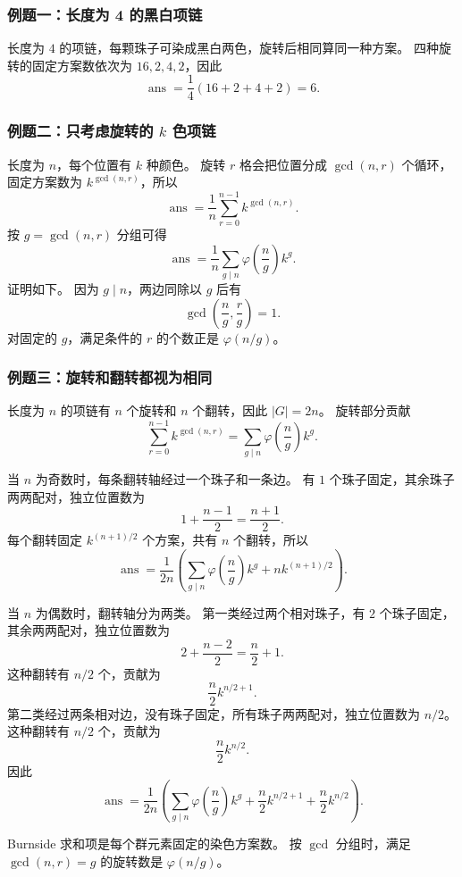 \subsubsection{例题一：长度为 4 的黑白项链}

长度为 $4$ 的项链，每颗珠子可染成黑白两色，旋转后相同算同一种方案。
四种旋转的固定方案数依次为 $16,2,4,2$，因此
\[
  \operatorname{ans}=\frac14(16+2+4+2)=6.
\]

\subsubsection{例题二：只考虑旋转的 $k$ 色项链}

长度为 $n$，每个位置有 $k$ 种颜色。
旋转 $r$ 格会把位置分成 $\gcd(n,r)$ 个循环，固定方案数为 $k^{\gcd(n,r)}$，所以
\[
  \operatorname{ans}
  =\frac1n\sum_{r=0}^{n-1}k^{\gcd(n,r)}.
\]
按 $g=\gcd(n,r)$ 分组可得
\[
  \operatorname{ans}
  =\frac1n\sum_{g\mid n}\varphi\!\left(\frac ng\right)k^g.
\]
证明如下。
因为 $g\mid n$，两边同除以 $g$ 后有
\[
  \gcd\!\left(\frac ng,\frac rg\right)=1.
\]
对固定的 $g$，满足条件的 $r$ 的个数正是 $\varphi(n/g)$。

\subsubsection{例题三：旋转和翻转都视为相同}

长度为 $n$ 的项链有 $n$ 个旋转和 $n$ 个翻转，因此 $|G|=2n$。
旋转部分贡献
\[
  \sum_{r=0}^{n-1}k^{\gcd(n,r)}
  =\sum_{g\mid n}\varphi\!\left(\frac ng\right)k^g.
\]

当 $n$ 为奇数时，每条翻转轴经过一个珠子和一条边。
有 $1$ 个珠子固定，其余珠子两两配对，独立位置数为
\[
  1+\frac{n-1}{2}=\frac{n+1}{2}.
\]
每个翻转固定 $k^{(n+1)/2}$ 个方案，共有 $n$ 个翻转，所以
\[
  \operatorname{ans}
  =\frac1{2n}\left(
    \sum_{g\mid n}\varphi\!\left(\frac ng\right)k^g
    +nk^{(n+1)/2}
  \right).
\]

当 $n$ 为偶数时，翻转轴分为两类。
第一类经过两个相对珠子，有 $2$ 个珠子固定，其余两两配对，独立位置数为
\[
  2+\frac{n-2}{2}=\frac n2+1.
\]
这种翻转有 $n/2$ 个，贡献为
\[
  \frac n2k^{n/2+1}.
\]
第二类经过两条相对边，没有珠子固定，所有珠子两两配对，独立位置数为 $n/2$。
这种翻转有 $n/2$ 个，贡献为
\[
  \frac n2k^{n/2}.
\]
因此
\[
  \operatorname{ans}
  =\frac1{2n}\left(
    \sum_{g\mid n}\varphi\!\left(\frac ng\right)k^g
    +\frac n2k^{n/2+1}
    +\frac n2k^{n/2}
  \right).
\]

\begin{icpcwarning}[固定方案不是操作个数]
  Burnside 求和项是每个群元素固定的染色方案数。
  按 $\gcd$ 分组时，满足 $\gcd(n,r)=g$ 的旋转数是 $\varphi(n/g)$。
\end{icpcwarning}
